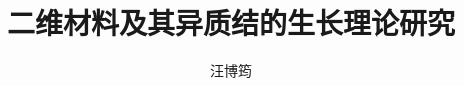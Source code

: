 \documentclass[doctor]{thesis-uestc}
\title{二维材料及其异质结的生长理论研究}{Growth mechanism of two-dimensional
materials and heterostructure}
\author{汪博筠}{Wang Bojun}
\begin{document}
\makecover




\tableofcontents


\end{document}
